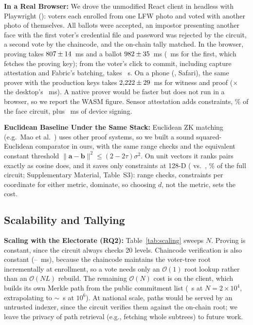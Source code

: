 \documentclass[10pt,letterpaper,journal]{IEEEtran}
\begin{document}
\textbf{In a Real Browser:} We drove the unmodified React client in headless \nBrowserName{} with Playwright (): \nBrowserVoters{} voters each enrolled from one LFW photo and voted with another photo of themselves. All ballots were accepted, an impostor presenting another face with the first voter's credential file and password was rejected by the circuit, a second vote by the chaincode, and the on-chain tally matched. In the browser, proving takes $807 \pm 14$~ms and a ballot $982 \pm 35$~ms (\nBrowserColdMs~ms for the first, which fetches the proving key); from the voter's click to commit, including capture attestation and Fabric's batching, takes \nBrowserSubmitS~s. On a phone (\nPhoneDevice, Safari), the same prover with the production keys takes $2{,}222 \pm 29$~ms for witness and proof (\nPhoneRatio$\times$ the desktop's \nDimProveMs~ms). A native prover would be faster but does not run in a browser, so we report the WASM figure. Sensor attestation adds \nAttestConstraints{} constraints, \nAttestShare\% of the face circuit, plus \nSignMs~ms of device signing.

\textbf{Euclidean Baseline Under the Same Stack:}\label{subsec:eval_baseline} Euclidean ZK matching (e.g.\ Mao et al.~\cite{Mao2023}) uses other proof systems, so we built a sound squared-Euclidean comparator in ours, with the same range checks and the equivalent constant threshold $\|\mathbf{a}-\mathbf{b}\|^2 \le (2-2\tau)\sigma^2$. On unit vectors it ranks pairs exactly as cosine does, and it saves only \nEuclidSave{} constraints at 128-D (\nEuclidConstraints{} vs.\ \nCosConstraints, \nEuclidSaveShare\% of the full circuit; Supplementary Material, Table~S3): range checks, \nRangePerCoord{} constraints per coordinate for either metric, dominate, so choosing $d$, not the metric, sets the cost.

\subsection{Scalability and Tallying}
\label{subsec:eval_scalability}

\textbf{Scaling with the Electorate (RQ2):}
Table~\ref{tab:scaling} sweeps $N$. Proving is constant, since the circuit always checks 20 levels. Chaincode verification is also constant (\nScaleCastMin--\nScaleCastMax~ms), because the chaincode maintains the voter-tree root incrementally at enrollment, so a vote needs only an $\mathcal{O}(1)$ root lookup rather than an $\mathcal{O}(NL)$ rebuild. The remaining $\mathcal{O}(N)$ cost is on the client, which builds its own Merkle path from the public commitment list (\nScalePathsTopS~s at $N = 2\times10^4$, extrapolating to $\sim$\nScalePathsMillionS~s at $10^6$). At national scale, paths would be served by an untrusted indexer, since the circuit verifies them against the on-chain root; we leave the privacy of path retrieval (e.g., fetching whole subtrees) to future work.
\end{document}
